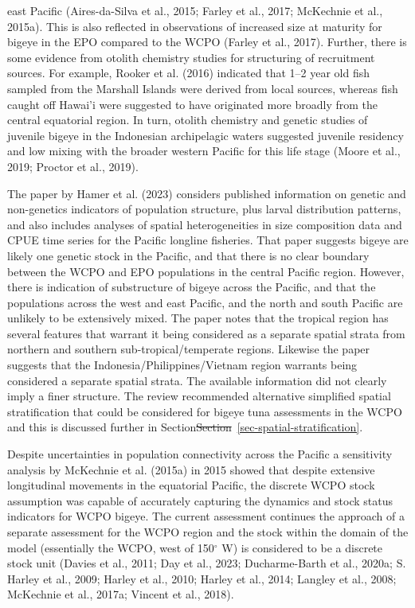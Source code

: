 \documentclass[
  english,
  a4paper,
  a4paper,
  11pt]{SCreport}
\providecommand{\DIFdel}[1]{{\protect\color{red}\sout{#1}}}                      %
\providecommand{\DIFdelbegin}{} %
\providecommand{\DIFdelend}{} %
\newcommand{\DIFscaledelfig}{0.5}
\newlength{\DIFdelgraphicswidth} %
\newlength{\DIFdelgraphicsheight} %
\newcommand{\DIFdelincludegraphics}[2][]{%
\sbox{\DIFdelgraphicsbox}{\DIFOincludegraphics[#1]{#2}}%
\settoboxwidth{\DIFdelgraphicswidth}{\DIFdelgraphicsbox} %
\settoboxtotalheight{\DIFdelgraphicsheight}{\DIFdelgraphicsbox} %
\scalebox{\DIFscaledelfig}{%
\parbox[b]{\DIFdelgraphicswidth}{\usebox{\DIFdelgraphicsbox}\\[-\baselineskip] \rule{\DIFdelgraphicswidth}{0em}}\llap{\resizebox{\DIFdelgraphicswidth}{\DIFdelgraphicsheight}{%
\setlength{\unitlength}{\DIFdelgraphicswidth}%
\begin{picture}(1,1)%
\thicklines\linethickness{2pt} %
{\color[rgb]{1,0,0}\put(0,0){\framebox(1,1){}}}%
{\color[rgb]{1,0,0}\put(0,0){\line( 1,1){1}}}%
{\color[rgb]{1,0,0}\put(0,1){\line(1,-1){1}}}%
\end{picture}%
}\hspace*{3pt}}} %
} %
\DeclareRobustCommand{\DIFdelbegin}{\DIFOdelbegin \let\includegraphics\DIFdelincludegraphics} %
\DeclareRobustCommand{\DIFdelend}{\DIFOaddend \let\includegraphics\DIFOincludegraphics} %
\begin{document}
east Pacific (Aires-da-Silva et al., 2015; Farley et al., 2017;
McKechnie et al., 2015a). This is also reflected in observations of
increased size at maturity for bigeye in the EPO compared to the WCPO
(Farley et al., 2017). Further, there is some evidence from otolith
chemistry studies for structuring of recruitment sources. For example,
Rooker et al. (2016) indicated that 1--2 year old fish sampled from the
Marshall Islands were derived from local sources, whereas fish caught
off Hawai'i were suggested to have originated more broadly from the
central equatorial region. In turn, otolith chemistry and genetic
studies of juvenile bigeye in the Indonesian archipelagic waters
suggested juvenile residency and low mixing with the broader western
Pacific for this life stage (Moore et al., 2019; Proctor et al., 2019).

The paper by Hamer et al. (2023) considers published information on
genetic and non-genetics indicators of population structure, plus larval
distribution patterns, and also includes analyses of spatial
heterogeneities in size composition data and CPUE time series for the
Pacific longline fisheries. That paper suggests bigeye are likely one
genetic stock in the Pacific, and that there is no clear boundary
between the WCPO and EPO populations in the central Pacific region.
However, there is indication of substructure of bigeye across the
Pacific, and that the populations across the west and east Pacific, and
the north and south Pacific are unlikely to be extensively mixed. The
paper notes that the tropical region has several features that warrant
it being considered as a separate spatial strata from northern and
southern sub-tropical/temperate regions. Likewise the paper suggests
that the Indonesia/Philippines/Vietnam region warrants being considered
a separate spatial strata. The available information did not clearly
imply a finer structure. The review recommended alternative simplified
spatial stratification that could be considered for bigeye tuna
assessments in the WCPO and this is discussed further in
Section\DIFdelbegin \DIFdel{Section}\DIFdelend ~\ref{sec-spatial-stratification}.

Despite uncertainties in population connectivity across the Pacific a
sensitivity analysis by McKechnie et al. (2015a) in 2015 showed that
despite extensive longitudinal movements in the equatorial Pacific, the
discrete WCPO stock assumption was capable of accurately capturing the
dynamics and stock status indicators for WCPO bigeye. The current
assessment continues the approach of a separate assessment for the WCPO
region and the stock within the domain of the model (essentially the
WCPO, west of 150\(^\circ\) W) is considered to be a discrete stock unit
(Davies et al., 2011; Day et al., 2023; Ducharme-Barth et al., 2020a; S.
Harley et al., 2009; Harley et al., 2010; Harley et al., 2014; Langley
et al., 2008; McKechnie et al., 2017a; Vincent et al., 2018).
\end{document}
